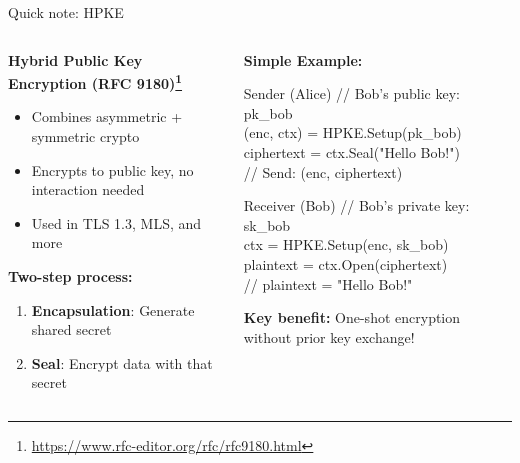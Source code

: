 \documentclass[aspectratio=169, lualatex, handout]{beamer}
\begin{document}
\begin{frame}{Quick note: HPKE}
	\begin{columns}[c]
		\begin{column}{0.5\textwidth}
			\textbf{Hybrid Public Key Encryption (RFC 9180)\footnote{\url{https://www.rfc-editor.org/rfc/rfc9180.html}}}
			\begin{itemize}
				\item Combines asymmetric + symmetric crypto
				\item Encrypts to public key, no interaction needed
				\item Used in TLS 1.3, MLS, and more
			\end{itemize}
			\textbf{Two-step process:}
			\begin{enumerate}
				\item \textbf{Encapsulation}: Generate shared secret
				\item \textbf{Seal}: Encrypt data with that secret
			\end{enumerate}
		\end{column}
		\begin{column}{0.5\textwidth}
			\textbf{Simple Example:}
			\begin{exampleblock}{Sender (Alice)}
				\ttfamily\scriptsize
				// Bob's public key: pk\_bob\\
				(enc, ctx) = HPKE.Setup(pk\_bob)\\
				ciphertext = ctx.Seal("Hello Bob!")\\
				// Send: (enc, ciphertext)
			\end{exampleblock}
			\begin{exampleblock}{Receiver (Bob)}
				\ttfamily\scriptsize
				// Bob's private key: sk\_bob\\
				ctx = HPKE.Setup(enc, sk\_bob)\\
				plaintext = ctx.Open(ciphertext)\\
				// plaintext = "Hello Bob!"
			\end{exampleblock}
			\textbf{Key benefit:} One-shot encryption without prior key exchange!
		\end{column}
	\end{columns}
\end{frame}
\end{document}
